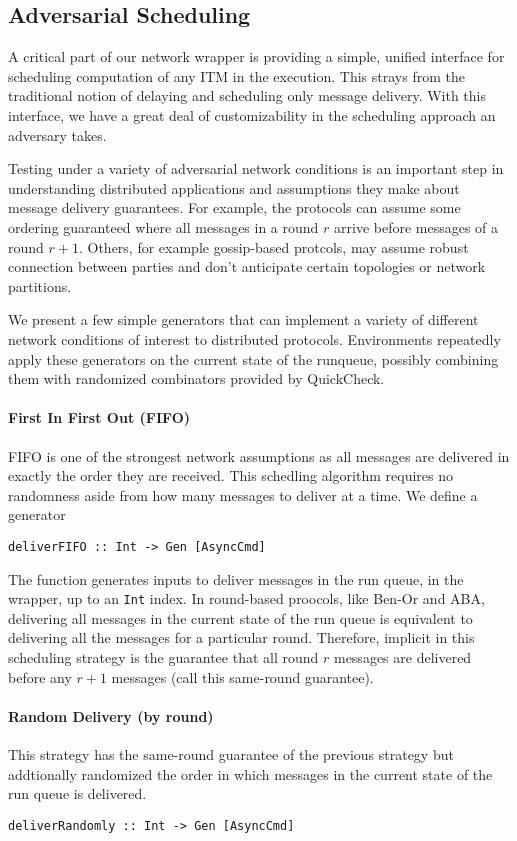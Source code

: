 \subsection{Adversarial Scheduling}
A critical part of our network wrapper is providing a simple, unified interface for scheduling computation of any ITM in the execution.
This strays from the traditional notion of delaying and scheduling only message delivery.
With this interface, we have a great deal of customizability in the scheduling approach an adversary takes. 

Testing under a variety of adversarial network conditions is an important step in understanding distributed applications and assumptions they make about message delivery guarantees.
For example, the protocols can assume some ordering guaranteed where all messages in a round $r$ arrive before messages of a round $r+1$. 
Others, for example gossip-based protcols, may assume robust connection between parties and don't anticipate certain topologies or network partitions.

We present a few simple generators that can implement a variety of different network conditions of interest to distributed protocols.
Environments repeatedly apply these generators on the current state of the runqueue, possibly combining them with randomized combinators provided by QuickCheck. 

\paragraph{First In First Out (FIFO)}
FIFO is one of the strongest network assumptions as all messages are delivered in exactly the order they are received. 
This schedling algorithm requires no randomness aside from how many messages to deliver at a time.
We define a generator 
\begin{lstlisting}
deliverFIFO :: Int -> Gen [AsyncCmd]
\end{lstlisting}
The function generates inputs to deliver messages in the run queue, in the wrapper, up to an \texttt{Int} index. 
In round-based proocols, like Ben-Or and ABA, delivering all messages in the current state of the run queue is equivalent to delivering
all the messages for a particular round. 
Therefore, implicit in this scheduling strategy is the guarantee that all round $r$ messages are delivered before any $r+1$ messages (call this same-round guarantee).

\paragraph{Random Delivery (by round)}
This strategy has the same-round guarantee of the previous strategy but addtionally randomized the order
in which messages in the current state of the run queue is delivered.
\begin{lstlisting}
deliverRandomly :: Int -> Gen [AsyncCmd]
\end{lstlisting}

